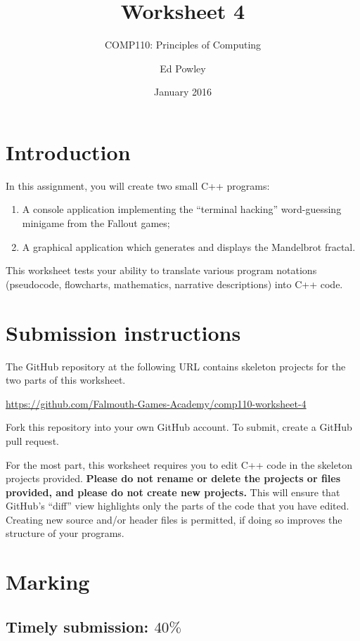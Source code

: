 \documentclass{scrartcl}
\title{Worksheet 4}
\subtitle{COMP110: Principles of Computing}
\author{Ed Powley}
\date{January 2016}
\begin{document}
\maketitle

\section*{Introduction}

In this assignment, you will create two small C++ programs:
\begin{enumerate}[label=\Alph*.]
	\item A console application implementing the ``terminal hacking'' word-guessing minigame from the Fallout games;
	\item A graphical application which generates and displays the Mandelbrot fractal.
\end{enumerate}

This worksheet tests your ability to translate various program notations (pseudocode, flowcharts,
mathematics, narrative descriptions) into C++ code.

\section*{Submission instructions}

The GitHub repository at the following URL contains skeleton projects for the two parts of this worksheet.
\begin{center}
\url{https://github.com/Falmouth-Games-Academy/comp110-worksheet-4}
\end{center}
Fork this repository into your own GitHub account. To submit, create a GitHub pull request.

For the most part, this worksheet requires you to edit C++ code in the skeleton projects provided.
\textbf{Please do not rename or delete the projects or files provided, and please do not create new projects.}
This will ensure that GitHub's ``diff'' view highlights only the parts of the code that you have edited.
Creating new source and/or header files is permitted, if doing so improves the structure of your programs.

\section*{Marking}

\subsection*{Timely submission: $40\%$}
\end{document}
